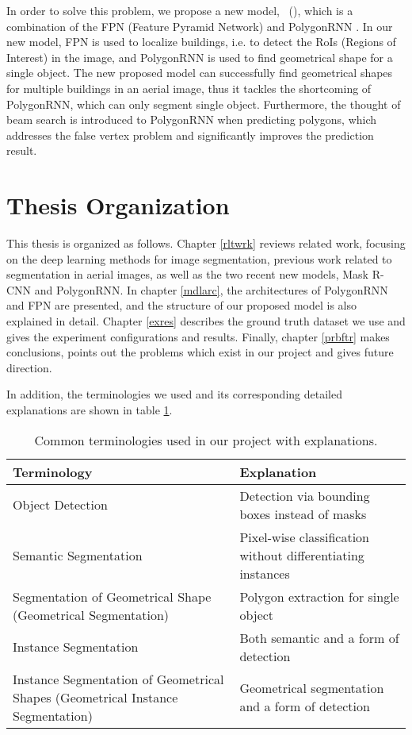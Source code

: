 In order to solve this problem, we propose a new model, \modelnameshort\ (\modelnamelong), which is a combination of the FPN (Feature Pyramid Network) \cite{fpn} and PolygonRNN \cite{polygonrnn}. In our new model, FPN is used to localize buildings, i.e. to detect the RoIs (Regions of Interest) in the image, and PolygonRNN is used to find geometrical shape for a single object. The new proposed model can successfully find geometrical shapes for multiple buildings in an aerial image, thus it tackles the shortcoming of PolygonRNN, which can only segment single object. Furthermore, the thought of beam search is introduced to PolygonRNN when predicting polygons, which addresses the false vertex problem and significantly improves the prediction result.

\section{Thesis Organization}\label{thsorg}
This thesis is organized as follows. Chapter \ref{rltwrk} reviews related work, focusing on the deep learning methods for image segmentation, previous work related to segmentation in aerial images, as well as the two recent new models, Mask R-CNN \cite{maskrcnn} and PolygonRNN. In chapter \ref{mdlarc}, the architectures of PolygonRNN and FPN are presented, and the structure of our proposed model is also explained in detail. Chapter \ref{exres} describes the ground truth dataset we use and gives the experiment configurations and results. Finally, chapter \ref{prbftr} makes conclusions, points out the problems which exist in our project and gives future direction.

In addition, the terminologies we used and its corresponding detailed explanations are shown in table \ref{tab:term}.

\begin{table}[ht!]
	\centering
	\caption[Common terminologies used in our project with explanations]{Common terminologies used in our project with explanations.}
	\label{tab:term}
	\begin{tabularx}{\textwidth}{X|X}
	\hline
	\textbf{Terminology} & \textbf{Explanation}\\ \hline
	Object Detection & Detection via bounding boxes instead of masks \\
	Semantic Segmentation & Pixel-wise classification without differentiating instances \\
	Segmentation of Geometrical Shape (Geometrical Segmentation) & Polygon extraction for single object \\ \hline
	Instance Segmentation & Both semantic and a form of detection \\
	Instance Segmentation of Geometrical Shapes (Geometrical Instance Segmentation) & Geometrical segmentation and a form of detection \\
	\hline
	\end{tabularx}
\end{table}


